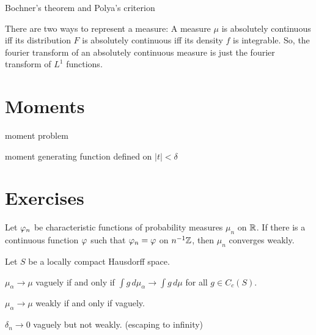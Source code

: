 \documentclass{../../large}
\begin{document}
\begin{prb}
Bochner's theorem and Polya's criterion
\end{prb}


There are two ways to represent a measure:
A measure $\mu$ is absolutely continuous iff its distribution $F$ is absolutely continuous iff its density $f$ is integrable.
So, the fourier transform of an absolutely continuous measure is just the fourier transform of $L^1$ functions.



\section{Moments}

moment problem

moment generating function defined on $|t|<\delta$


\section*{Exercises}
\begin{prb}
Let $\varphi_n$ be characteristic functions of probability measures $\mu_n$ on $\mathbb{R}$.
If there is a continuous function $\varphi$ such that $\varphi_n=\varphi$ on $n^{-1}\mathbb{Z}$, then $\mu_n$ converges weakly.
\end{prb}


\begin{prb}
\end{prb}


\begin{prb}
Let $S$ be a locally compact Hausdorff space.
\begin{parts}
\item $\mu_\alpha\to\mu$ vaguely if and only if $\int g\,d\mu_\alpha\to\int g\,d\mu$ for all $g\in C_c(S)$.
\item $\mu_\alpha\to\mu$ weakly if and only if vaguely.
\item $\delta_n\to0$ vaguely but not weakly. (escaping to infinity)
\end{parts}
\end{prb}
\begin{pf}
\end{pf}
\end{document}
